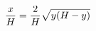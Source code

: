 \documentclass[preview]{standalone}
\begin{document}
\begin{align*}
\special{dvisvgm:raw <g id='unique000'>}\frac{x}{H} = \frac{2}{H} \sqrt{y ( H - y )}\special{dvisvgm:raw </g>}
\end{align*}
\end{document}
